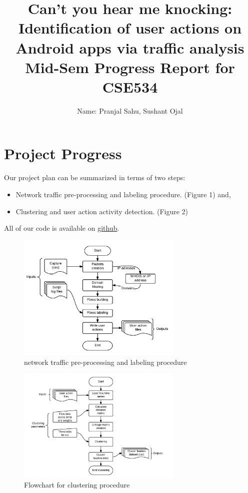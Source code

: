 \documentclass[12pt]{article}
\begin{document}
\title{ Can't you hear me knocking:
Identification of user actions on Android apps via traffic analysis \\ \large Mid-Sem Progress Report for CSE534}
\author{Name: Pranjal Sahu,  Sushant Ojal}
\maketitle

\section{Project Progress}

Our project plan can be summarized in terms of two steps:
\begin{itemize}
    \item Network traffic pre-processing and labeling procedure. (Figure 1) and,
     \item Clustering and user action activity detection. (Figure 2)
\end{itemize}
All of our code is available on \href{http://github.com/PranjalSahu/CSE534_project}{github}.

    \begin{figure}[h]
    \begin{center}
       \includegraphics[width=300px]{method.jpeg}
    \end{center}
       \caption{network traffic pre-processing and labeling procedure}
    \label{fig:long}
    \label{fig:onecol}
    \end{figure}

    \begin{figure}[h]
    \begin{center}
       \includegraphics[width=300px]{cluster.jpg}
    \end{center}
       \caption{Flowchart for clustering procedure}
    \label{fig:long}
    \label{fig:onecol}
    \end{figure} 
    
\end{document}
